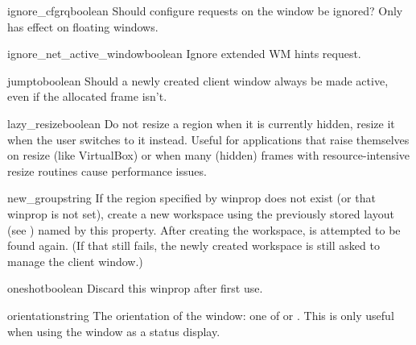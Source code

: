 \begin{winprop}{ignore_cfgrq}{boolean}
    Should configure requests on the window be ignored?
    Only has effect on floating windows.
\end{winprop}


\begin{winprop}{ignore_net_active_window}{boolean}
    Ignore extended WM hints  request. 
\end{winprop}


\begin{winprop}{jumpto}{boolean}
    Should a newly created client window always be made
    active, even if the allocated frame isn't. 
\end{winprop}


\begin{winprop}{lazy_resize}{boolean}
    Do not resize a region when it is currently hidden,
    resize it when the user switches to it instead. Useful for
    applications that raise themselves on resize (like VirtualBox)
    or when many (hidden) frames with resource-intensive resize
    routines cause performance issues.
\end{winprop}


\begin{winprop}{new_group}{string}
    If the region specified by  winprop does not exist
    (or that winprop is not set), create a new workspace using the 
    previously stored layout (see ) named by
    this property. After creating the workspace,  is 
    attempted to be found again. (If that still fails, the newly 
    created workspace is still asked to manage the client window.)
\end{winprop}


\begin{winprop}{oneshot}{boolean}
    Discard this winprop after first use. 
\end{winprop}


\begin{winprop}{orientation}{string}
    The orientation of the window: one of  or
    . This is only useful when using the
    window as a status display.
\end{winprop}


